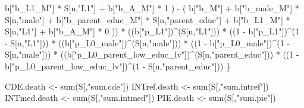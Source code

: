 \documentclass[
]{book}
\newenvironment{Shaded}{\begin{snugshade}}{\end{snugshade}}
\newcommand{\DecValTok}[1]{\textcolor[rgb]{0.00,0.00,0.81}{#1}}
\newcommand{\FunctionTok}[1]{\textcolor[rgb]{0.00,0.00,0.00}{#1}}
\newcommand{\NormalTok}[1]{#1}
\newcommand{\OtherTok}[1]{\textcolor[rgb]{0.56,0.35,0.01}{#1}}
\newcommand{\SpecialCharTok}[1]{\textcolor[rgb]{0.00,0.00,0.00}{#1}}
\newcommand{\StringTok}[1]{\textcolor[rgb]{0.31,0.60,0.02}{#1}}
\begin{document}
\begin{Shaded}
\begin{Highlighting}[]
\NormalTok{            b[}\StringTok{"b\_L1\_M"}\NormalTok{] }\SpecialCharTok{*}\NormalTok{ S[n,}\StringTok{"L1"}\NormalTok{] }\SpecialCharTok{+}
\NormalTok{            b[}\StringTok{"b\_A\_M"}\NormalTok{] }\SpecialCharTok{*} \DecValTok{1}\NormalTok{ ) }\SpecialCharTok{{-}} 
\NormalTok{          ( b[}\StringTok{"b\_M"}\NormalTok{] }\SpecialCharTok{+} 
\NormalTok{              b[}\StringTok{"b\_male\_M"}\NormalTok{] }\SpecialCharTok{*}\NormalTok{ S[n,}\StringTok{"male"}\NormalTok{] }\SpecialCharTok{+} 
\NormalTok{              b[}\StringTok{"b\_parent\_educ\_M"}\NormalTok{] }\SpecialCharTok{*}\NormalTok{ S[n,}\StringTok{"parent\_educ"}\NormalTok{] }\SpecialCharTok{+} 
\NormalTok{              b[}\StringTok{"b\_L1\_M"}\NormalTok{] }\SpecialCharTok{*}\NormalTok{ S[n,}\StringTok{"L1"}\NormalTok{] }\SpecialCharTok{+}
\NormalTok{              b[}\StringTok{"b\_A\_M"}\NormalTok{] }\SpecialCharTok{*} \DecValTok{0}\NormalTok{ )) }\SpecialCharTok{*} 
\NormalTok{      ((b[}\StringTok{"p\_L1"}\NormalTok{])}\SpecialCharTok{\^{}}\NormalTok{(S[n,}\StringTok{"L1"}\NormalTok{])) }\SpecialCharTok{*}
\NormalTok{      ((}\DecValTok{1} \SpecialCharTok{{-}}\NormalTok{ b[}\StringTok{"p\_L1"}\NormalTok{])}\SpecialCharTok{\^{}}\NormalTok{(}\DecValTok{1} \SpecialCharTok{{-}}\NormalTok{ S[n,}\StringTok{"L1"}\NormalTok{])) }\SpecialCharTok{*}
\NormalTok{      ((b[}\StringTok{"p\_L0\_male"}\NormalTok{])}\SpecialCharTok{\^{}}\NormalTok{(S[n,}\StringTok{"male"}\NormalTok{])) }\SpecialCharTok{*} 
\NormalTok{      ((}\DecValTok{1} \SpecialCharTok{{-}}\NormalTok{ b[}\StringTok{"p\_L0\_male"}\NormalTok{])}\SpecialCharTok{\^{}}\NormalTok{(}\DecValTok{1} \SpecialCharTok{{-}}\NormalTok{ S[n,}\StringTok{"male"}\NormalTok{])) }\SpecialCharTok{*} 
\NormalTok{      ((b[}\StringTok{"p\_L0\_parent\_low\_educ\_lv"}\NormalTok{])}\SpecialCharTok{\^{}}\NormalTok{(S[n,}\StringTok{"parent\_educ"}\NormalTok{])) }\SpecialCharTok{*}
\NormalTok{      ((}\DecValTok{1} \SpecialCharTok{{-}}\NormalTok{ b[}\StringTok{"p\_L0\_parent\_low\_educ\_lv"}\NormalTok{])}\SpecialCharTok{\^{}}\NormalTok{(}\DecValTok{1} \SpecialCharTok{{-}}\NormalTok{ S[n,}\StringTok{"parent\_educ"}\NormalTok{])) }
\NormalTok{    \}}
  
\NormalTok{  CDE.death }\OtherTok{\textless{}{-}} \FunctionTok{sum}\NormalTok{(S[,}\StringTok{"sum.cde"}\NormalTok{])}
\NormalTok{  INTref.death }\OtherTok{\textless{}{-}} \FunctionTok{sum}\NormalTok{(S[,}\StringTok{"sum.intref"}\NormalTok{])}
\NormalTok{  INTmed.death }\OtherTok{\textless{}{-}} \FunctionTok{sum}\NormalTok{(S[,}\StringTok{"sum.intmed"}\NormalTok{])}
\NormalTok{  PIE.death }\OtherTok{\textless{}{-}} \FunctionTok{sum}\NormalTok{(S[,}\StringTok{"sum.pie"}\NormalTok{])}
  

\end{Highlighting}
\end{Shaded}
\end{document}
